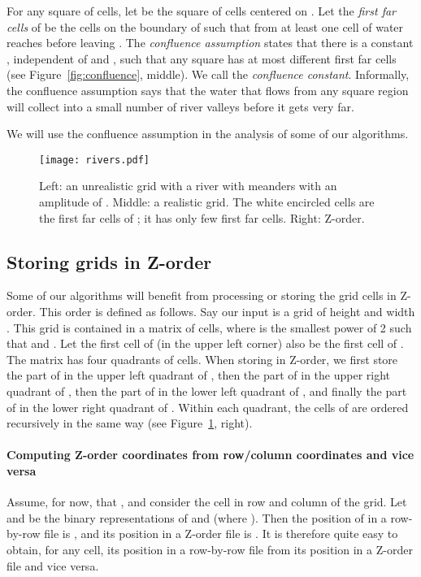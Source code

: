 \documentclass[10pt,a4paper]{article}
\begin{document}
For any square  of  cells, let  be the square of  cells centered on .
Let the \emph{first far cells} of  be the cells  on the boundary of  such that from at least one cell  of  water reaches  before leaving . The \emph{confluence assumption} states that there is a constant , independent of  and , such that any square  has at most  different first far cells (see Figure~\ref{fig:confluence}, middle). We call  the \emph{confluence constant}.
Informally, the confluence assumption says that the water that flows from any square region will collect into a small number of river valleys before it gets very far.

We will use the confluence assumption in the analysis of some of our algorithms.
\begin{figure}
\centering\texttt{[image: rivers.pdf]}
\caption{Left: an unrealistic grid with a river with  meanders with an amplitude of .
Middle: a realistic grid. The white encircled cells are the first far cells of ; it has only few first far cells.
Right: Z-order.}
\label{fig:meanders}\label{fig:confluence}\label{fig:zorder}
\end{figure}

\subsection{Storing grids in Z-order}\label{sec:Zorder}
Some of our algorithms will benefit from processing or storing the grid cells in Z-order. This order is defined as follows.
Say our input is a grid  of height  and width . This grid is contained in a matrix  of  cells, where  is the smallest power of 2 such that  and . Let the first cell of  (in the upper left corner) also be the first cell of . The matrix  has four quadrants of  cells. When storing  in Z-order, we first store the part of  in the upper left quadrant of , then the part of  in the upper right quadrant of , then the part of  in the lower left quadrant of , and finally the part of  in the lower right quadrant of . Within each quadrant, the cells of  are ordered recursively in the same way (see Figure~\ref{fig:zorder}, right).

\paragraph{Computing Z-order coordinates from row/column coordinates and vice versa}

Assume, for now, that , and consider the cell  in row  and column  of the grid. Let  and  be the binary representations of  and  (where ). Then the position of  in a row-by-row file is , and its position in a Z-order file is . It is therefore quite easy to obtain, for any cell, its position in a row-by-row file from its position in a Z-order file and vice versa.
\end{document}

